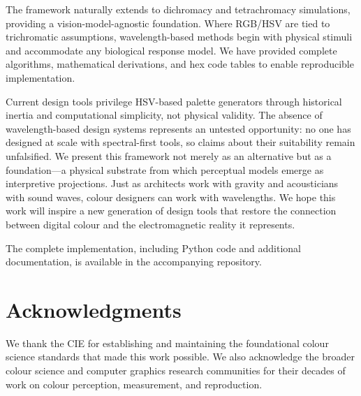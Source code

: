\documentclass[12pt,a4paper]{article}
\begin{document}
The framework naturally extends to dichromacy and tetrachromacy simulations, providing a vision-model-agnostic foundation. Where RGB/HSV are tied to trichromatic assumptions, wavelength-based methods begin with physical stimuli and accommodate any biological response model. We have provided complete algorithms, mathematical derivations, and hex code tables to enable reproducible implementation.

Current design tools privilege HSV-based palette generators through historical inertia and computational simplicity, not physical validity. The absence of wavelength-based design systems represents an untested opportunity: no one has designed at scale with spectral-first tools, so claims about their suitability remain unfalsified. We present this framework not merely as an alternative but as a foundation—a physical substrate from which perceptual models emerge as interpretive projections. Just as architects work with gravity and acousticians with sound waves, colour designers can work with wavelengths. We hope this work will inspire a new generation of design tools that restore the connection between digital colour and the electromagnetic reality it represents.

The complete implementation, including Python code and additional documentation, is available in the accompanying repository.

\section*{Acknowledgments}

We thank the CIE for establishing and maintaining the foundational colour science standards that made this work possible. We also acknowledge the broader colour science and computer graphics research communities for their decades of work on colour perception, measurement, and reproduction.



\end{document}
